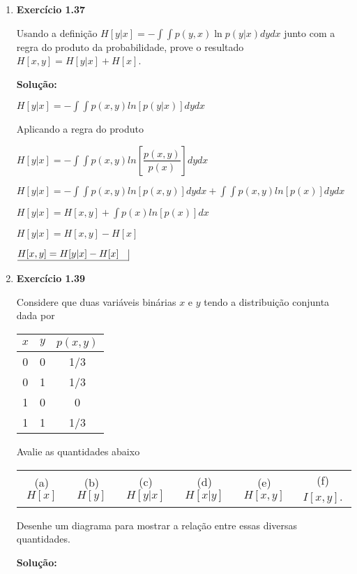 \begin{enumerate}
\item \textbf{Exercício 1.37} \par

Usando a definição $H[y|x] = - \int \int p(y,x) \ln p(y|x) dy dx$ junto com a regra do produto da probabilidade, prove o resultado $H[x,y] = H[y|x] + H[x]$. 
\newline \par
\textbf{Solução:}

$H[y|x] = \displaystyle - \int \int p(x,y) ln[p(y|x)] dy dx $

Aplicando a regra do produto

$H[y|x] = \displaystyle - \int \int p(x,y) ln\left[\dfrac{p(x,y)}{p(x)}\right] dy dx $

$H[y|x] = \displaystyle - \int \int p(x,y) ln[p(x,y)] dy dx + \int \int p(x,y) ln[p(x)] dy dx$

$H[y|x] = \displaystyle H[x,y] + \int p(x) ln[p(x)] dx$

$H[y|x] = H[x,y] - H[x]$

$\underline{H[x,y] = H[y|x] - H[x] \quad} \vline$

\item \textbf{Exercício 1.39} \par

Considere que duas variáveis binárias $x$ e $y$ tendo a distribuição conjunta dada por
\begin{center}
    \begin{tabular}{|c|c|c|}
    \hline
    $x$ & $y$ & $p(x, y)$ \\
    \hline
    0 & 0 & 1/3\\
    \hline
    0 & 1 & 1/3\\
    \hline
    1 & 0 & 0\\
    \hline
    1 & 1 & 1/3\\
    \hline
    \end{tabular}
\end{center}
Avalie as quantidades abaixo
\begin{center}
    \begin{tabular}{c c c c c c}
     (a)$H[x]$ & (b)$H[y]$ & (c)$H[y|x]$ & (d)$H[x|y]$ & (e)$H[x,y]$ & (f)$I[x,y]$. \\
    \end{tabular}
\end{center}
Desenhe um diagrama para mostrar a relação entre essas diversas quantidades.
\newline \par
\textbf{Solução:}


\end{enumerate}
